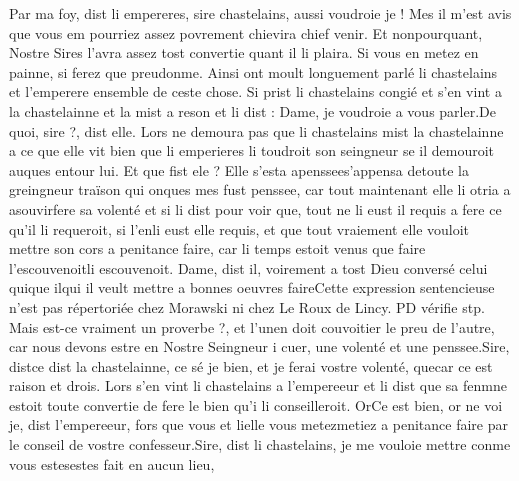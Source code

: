 \documentclass{article}
\begin{document}
\begin{pages}
   Par ma foy, 
      dist li empereres, sire chastelains, 
      aussi voudroie je ! Mes il m’est avis que vous em pourriez assez povrement 
      chievira chief venir. Et nonpourquant, Nostre Sires l’avra 
      assez tost convertie quant il li plaira. Si vous en metez en painne, 
      si ferez que preudonme.
   Ainsi ont moult longuement parlé 
   li chastelains et 
      l’emperere ensemble de ceste chose. 
   Si prist li chastelains congié et s’en vint a 
   la chastelainne et la mist a reson et li dist :
   Dame, je voudroie a vous parler.De quoi, sire ?, dist elle. 
   Lors ne demoura pas que li chastelains mist la chastelainne 
   a ce que elle vit bien que li emperieres li toudroit 
   son seingneur se il demouroit auques entour lui. Et que fist ele ? Elle 
   s’esta apenssees'appensa 
   detoute 
   la greingneur traïson qui onques mes fust penssee, car tout maintenant elle li otria a 
   asouvirfere sa volenté et si li dist pour voir que, 
   tout ne li eust il requis a fere ce qu’il li requeroit, si 
      l’enli eust elle requis, et que tout vraiement elle vouloit mettre son 
      cors a penitance faire, car li temps estoit venus que faire 
      l'escouvenoitli escouvenoit.
   Dame, dist il, voirement a tost Dieu conversé celui 
      quique ilqui il veult mettre a bonnes 
      oeuvres faireCette expression sentencieuse 
         n'est pas répertoriée chez Morawski ni chez Le Roux de Lincy. PD vérifie stp. Mais est-ce vraiment un proverbe ?, et 
      l’unen doit couvoitier le preu de l’autre, car nous 
      devons estre en Nostre Seingneur i cuer, une volenté et une penssee.Sire, distce dist 
      la chastelainne, ce sé je bien, et je ferai vostre volenté, 
      quecar ce est raison et drois. \pend
\pstart Lors s’en vint li chastelains a 
   l’empereeur et li dist que 
   sa fenmne estoit toute convertie de fere le bien 
      qu’i li conseilleroit.
   OrCe est bien, or 
      ne voi je, 
      dist l’empereeur, 
      fors que vous et lielle 
      vous metezmetiez a penitance faire par le conseil de vostre confesseur.Sire, dist li chastelains, 
      je me vouloie mettre conme vous estesestes fait en aucun lieu, 
      

\end{pages}
\end{document}

